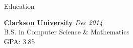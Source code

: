 \documentclass[
	11pt, %
]{resume} %
\begin{document}

\begin{rSection}{Education}
	
	\textbf{Clarkson University} \hfill \textit{Dec 2014} \\ 
	B.S. in Computer Science \& Mathematics \\
	GPA: 3.85
	
\end{rSection}

\end{document}
